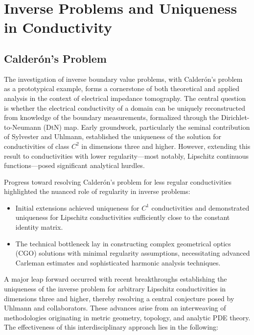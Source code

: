 \documentclass[sigconf]{acmart}
\begin{document}
\section{Inverse Problems and Uniqueness in Conductivity}

\subsection{Calderón's Problem}

The investigation of inverse boundary value problems, with Calderón's problem as a prototypical example, forms a cornerstone of both theoretical and applied analysis in the context of electrical impedance tomography. The central question is whether the electrical conductivity of a domain can be uniquely reconstructed from knowledge of the boundary measurements, formalized through the Dirichlet-to-Neumann (DtN) map. Early groundwork, particularly the seminal contribution of Sylvester and Uhlmann, established the uniqueness of the solution for conductivities of class $C^2$ in dimensions three and higher. However, extending this result to conductivities with lower regularity---most notably, Lipschitz continuous functions---posed significant analytical hurdles.

Progress toward resolving Calderón's problem for less regular conductivities highlighted the nuanced role of regularity in inverse problems:

\begin{itemize}
    \item Initial extensions achieved uniqueness for $C^1$ conductivities and demonstrated uniqueness for Lipschitz conductivities sufficiently close to the constant identity matrix.
    \item The technical bottleneck lay in constructing complex geometrical optics (CGO) solutions with minimal regularity assumptions, necessitating advanced Carleman estimates and sophisticated harmonic analysis techniques.
\end{itemize}

A major leap forward occurred with recent breakthroughs establishing the uniqueness of the inverse problem for arbitrary Lipschitz conductivities in dimensions three and higher, thereby resolving a central conjecture posed by Uhlmann and collaborators. These advances arise from an interweaving of methodologies originating in metric geometry, topology, and analytic PDE theory. The effectiveness of this interdisciplinary approach lies in the following:
\end{document}
